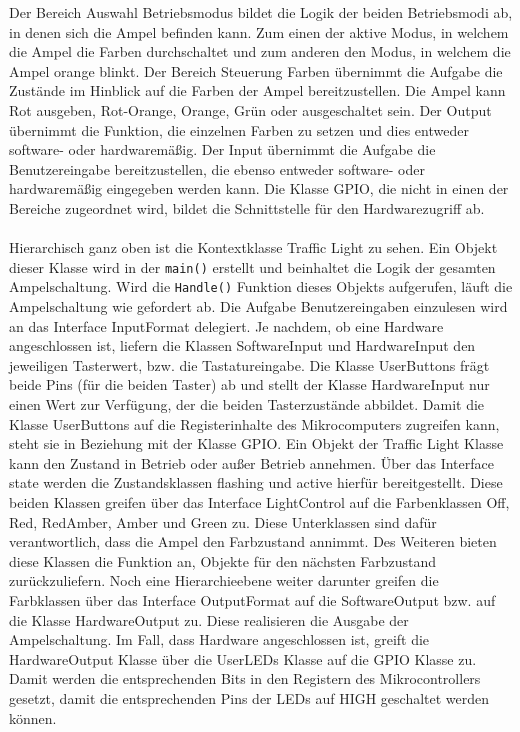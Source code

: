 Der Bereich \glqq Auswahl Betriebsmodus\grqq{} bildet die Logik der beiden Betriebsmodi ab, in denen sich die Ampel befinden kann. Zum einen der aktive Modus, in welchem die Ampel die Farben durchschaltet und zum anderen den Modus, in welchem die Ampel orange blinkt. Der Bereich \glqq Steuerung Farben\grqq{} übernimmt die Aufgabe die Zustände im Hinblick auf die Farben der Ampel bereitzustellen. Die Ampel kann Rot ausgeben, Rot-Orange, Orange, Grün oder ausgeschaltet sein. Der Output übernimmt die Funktion, die einzelnen Farben zu setzen und dies entweder software- oder hardwaremäßig. Der Input übernimmt die Aufgabe die Benutzereingabe bereitzustellen, die ebenso entweder software- oder hardwaremäßig eingegeben werden kann. Die Klasse GPIO, die nicht in einen der Bereiche zugeordnet wird, bildet die Schnittstelle für den Hardwarezugriff ab.\\
\\
Hierarchisch ganz oben ist die Kontextklasse \glqq Traffic Light\grqq{} zu sehen. Ein Objekt dieser Klasse wird in der\: \texttt{main()} erstellt und beinhaltet die Logik der gesamten Ampelschaltung. Wird die\: \texttt{Handle()} Funktion dieses Objekts aufgerufen, läuft die Ampelschaltung wie gefordert ab. Die Aufgabe Benutzereingaben einzulesen wird an das Interface \glqq InputFormat\grqq{} delegiert. Je nachdem, ob eine Hardware angeschlossen ist, liefern die Klassen \glqq SoftwareInput\grqq{} und \glqq HardwareInput\grqq{} den jeweiligen Tasterwert, bzw. die Tastatureingabe. Die Klasse \glqq UserButtons\grqq{} frägt beide Pins (für die beiden Taster) ab und stellt der Klasse \glqq HardwareInput\grqq{} nur einen Wert zur Verfügung, der die beiden Tasterzustände abbildet. Damit die Klasse \glqq UserButtons\grqq{} auf die Registerinhalte des Mikrocomputers zugreifen kann, steht sie in Beziehung mit der Klasse \glqq GPIO\grqq{}. Ein Objekt der \glqq Traffic Light\grqq{} Klasse kann den Zustand in Betrieb oder außer Betrieb annehmen. Über das Interface \glqq state\grqq{} werden die Zustandsklassen \glqq flashing\grqq{} und \glqq active\grqq{} hierfür bereitgestellt. Diese beiden Klassen greifen über das Interface \glqq LightControl\grqq{} auf die Farbenklassen \glqq Off\grqq{}, \glqq Red\grqq{}, \glqq RedAmber\grqq{}, \glqq Amber\grqq{} und \glqq Green\grqq{} zu. Diese Unterklassen sind dafür verantwortlich, dass die Ampel den Farbzustand annimmt. Des Weiteren bieten diese Klassen die Funktion an, Objekte für den nächsten Farbzustand zurückzuliefern. Noch eine Hierarchieebene weiter darunter greifen die Farbklassen über das Interface \glqq OutputFormat\grqq{} auf die \glqq SoftwareOutput\grqq{} bzw. auf die Klasse \glqq HardwareOutput\grqq{} zu. Diese realisieren die Ausgabe der Ampelschaltung. Im Fall, dass Hardware angeschlossen ist, greift die \glqq HardwareOutput\grqq{} Klasse über die \glqq UserLEDs\grqq{} Klasse auf die \glqq GPIO\grqq{} Klasse zu. Damit werden die entsprechenden Bits in den Registern des Mikrocontrollers gesetzt, damit die entsprechenden Pins der LEDs auf HIGH geschaltet werden können.

